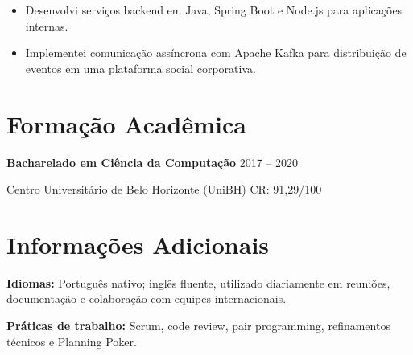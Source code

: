 \documentclass[10pt,a4paper]{article}
\begin{document}

\begin{itemize}

\item Desenvolvi serviços backend em Java, Spring Boot e Node.js para aplicações internas.

\item Implementei comunicação assíncrona com Apache Kafka para distribuição de eventos em uma plataforma social corporativa.

\end{itemize}

\section{Formação Acadêmica}

\textbf{Bacharelado em Ciência da Computação} \hfill 2017 -- 2020

Centro Universitário de Belo Horizonte (UniBH) \hfill CR: 91,29/100

\section{Informações Adicionais}

\textbf{Idiomas:} Português nativo; inglês fluente, utilizado diariamente em reuniões, documentação e colaboração com equipes internacionais.

\textbf{Práticas de trabalho:} Scrum, code review, pair programming, refinamentos técnicos e Planning Poker.
\end{document}
